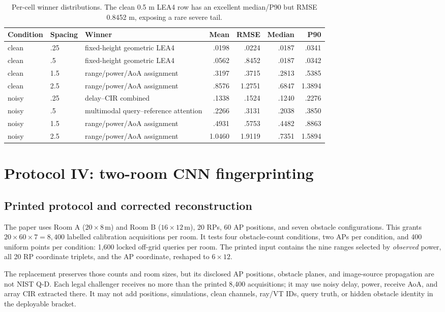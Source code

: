 \documentclass[10pt]{article}
\newcommand{\m}{\,\mathrm m}
\begin{document}
\begin{table}[ht]
\centering\small
\begin{tabularx}{\linewidth}{@{}llYrrrr@{}}
\toprule Condition & Spacing & Winner & Mean & RMSE & Median & P90\\\midrule
clean & .25 & fixed-height geometric LEA4 & .0198 & .0224 & .0187 & .0341\\
clean & .5 & fixed-height geometric LEA4 & .0562 & .8452 & .0187 & .0342\\
clean & 1.5 & range/power/AoA assignment & .3197 & .3715 & .2813 & .5385\\
clean & 2.5 & range/power/AoA assignment & .8576 & 1.2751 & .6847 & 1.3894\\
noisy & .25 & delay--CIR combined & .1338 & .1524 & .1240 & .2276\\
noisy & .5 & multimodal query--reference attention & .2266 & .3131 & .2038 & .3850\\
noisy & 1.5 & range/power/AoA assignment & .4931 & .5753 & .4482 & .8863\\
noisy & 2.5 & range/power/AoA assignment & 1.0460 & 1.9119 & .7351 & 1.5894\\
\bottomrule
\end{tabularx}
\caption{Per-cell winner distributions.  The clean 0.5 m LEA4 row has an excellent median/P90 but RMSE 0.8452 m, exposing a rare severe tail.}
\end{table}

\section{Protocol IV: two-room CNN fingerprinting}

\subsection{Printed protocol and corrected reconstruction}

The paper uses Room A ($20\times8\m$) and Room B ($16\times12\m$), 20 RPs,
60 AP positions, and seven obstacle configurations.  This grants
$20\times60\times7=8{,}400$ labelled calibration acquisitions per room.  It
tests four obstacle-count conditions, two APs per condition, and 400 uniform
points per condition: 1,600 locked off-grid queries per room.  The printed
input contains the nine ranges selected by \emph{observed} power, all 20 RP
coordinate triplets, and the AP coordinate, reshaped to $6\times12$.

The replacement preserves those counts and room sizes, but its disclosed AP
positions, obstacle planes, and image-source propagation are not NIST Q-D.
Each legal challenger receives no more than the printed 8,400 acquisitions;
it may use noisy delay, power, receive AoA, and array CIR extracted there.  It
may not add positions, simulations, clean channels, ray/VT IDs, query truth, or
hidden obstacle identity in the deployable bracket.
\end{document}
